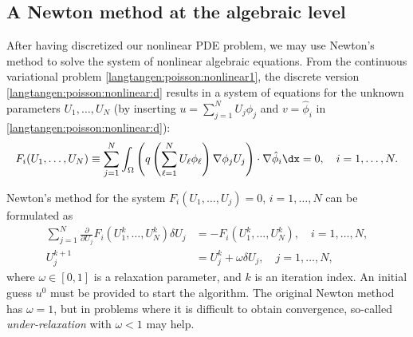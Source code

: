 \subsection{A Newton method at the algebraic level}
\label{langtangen:nonlinear:Newton:algebraic}
\label{Newton's method algebraic}

After having discretized our nonlinear PDE problem, we may
use Newton's method to solve the system of nonlinear algebraic equations.
From the continuous variational problem \eqref{langtangen:poisson:nonlinear1},
the discrete version \eqref{langtangen:poisson:nonlinear:d} results in a
system of equations for the unknown parameters $U_1,\ldots, U_N$
(by inserting $u = \sum_{j=1}^N U_j \phi_j$
and $v=\hat\phi_i$ in \eqref{langtangen:poisson:nonlinear:d}):
\begin{equation}
\label{langtangen:nonlinear:Newton:F1}
F_i(U_1,\ldots,U_N) \equiv
\sum_{j=1}^N
\int_\Omega \left( q\left(\sum_{\ell=1}^NU_\ell\phi_\ell\right)
\nabla \phi_j U_j\right)\cdot \nabla \hat\phi_i\dx = 0,\quad i=1,\ldots,N.
\end{equation}

\clearpage

\noindent
Newton's method for the system $F_i(U_1,\ldots,U_j)=0$, $i=1,\ldots,N$
can be formulated as
\begin{align}
\sum_{j=1}^N
\frac{\partial}{\partial U_j} F_i(U_1^k,\ldots,U_N^k)\delta U_j
  &= -F_i(U_1^k,\ldots,U_N^k),\quad i=1,\ldots,N,
\\
U_j^{k+1} &= U_j^k + \omega\delta U_j,\quad j=1,\ldots,N,
\end{align}
where $\omega\in [0,1]$ is a relaxation parameter, and $k$ is an
iteration index. An initial guess $u^0$ must be provided to start the
algorithm.  The original Newton method has $\omega=1$, but in problems
where it is difficult to obtain convergence, so-called
\emph{under-relaxation} with $\omega < 1$ may
help.

